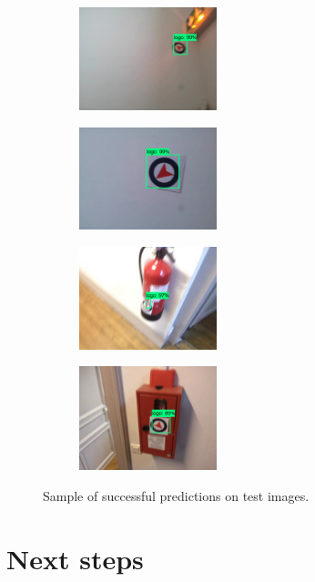 \documentclass[12pt]{article}%
\begin{document}
\captionsetup[subfigure]{labelformat=simple, labelsep=period}
\begin{figure}
	\centering
	\begin{subfigure}[t]{4cm}
		\centering
		\includegraphics[width=4cm]{images/detection1.PNG}
	\end{subfigure}
	\begin{subfigure}[t]{4cm}
		\centering
		\includegraphics[width=4cm]{images/detection2.PNG}
	\end{subfigure}
	\begin{subfigure}[t]{4cm}
		\centering
		\includegraphics[width=4cm]{images/detection3.PNG}
	\end{subfigure}
	\begin{subfigure}[t]{4cm}
		\centering
		\includegraphics[width=4cm]{images/detection4.PNG}
	\end{subfigure}
	\caption{Sample of successful predictions on test images.}\label{fig:finalPredictionResults}
\end{figure}

\section{Next steps}\label{next-steps}
\end{document}
